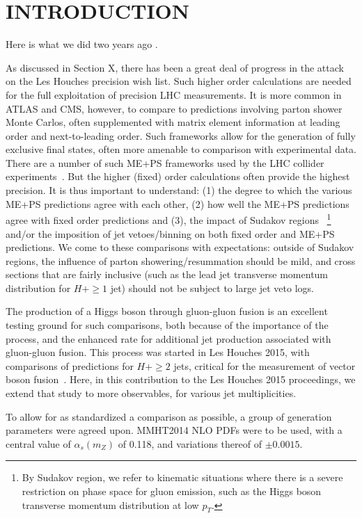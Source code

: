 \section{INTRODUCTION}
\label{sec:hjetscomp:intro}

Here is what we did two years ago \cite{AlcarazMaestre:2012vp}.

As discussed in Section X, there has been a great deal of progress in the attack on the Les Houches precision wish list. Such higher order calculations are needed for the full 
exploitation of precision LHC measurements. It is more common in ATLAS and CMS, however, 
to compare to predictions involving parton shower Monte Carlos, often supplemented with matrix element information at leading order and next-to-leading order. Such frameworks 
allow for the generation of fully exclusive final states, often more amenable to 
comparison with experimental data. There are a number of such ME+PS frameworks used by the LHC collider experiments~\cite{MEPS}. But the higher (fixed) order calculations often 
provide the highest precision. It is thus important to understand: (1) the degree to 
which the various ME+PS predictions agree with each other, (2) how well the ME+PS 
predictions agree with fixed order predictions and (3), the impact of Sudakov regions
~\footnote{By Sudakov region, we refer to kinematic situations where there is a
severe restriction on phase space for gluon emission, such as the Higgs boson transverse
momentum distribution at low $p_T$.} 
and/or the imposition of jet vetoes/binning on both fixed order and ME+PS predictions. 
We come to these comparisons with expectations: outside of Sudakov regions, the influence
of parton showering/resummation should be mild, and cross sections that are fairly 
inclusive (such as the lead jet transverse momentum distribution for $H+\ge1$ jet) 
should not be subject to large jet veto logs. 

The production of a Higgs boson through gluon-gluon fusion is an excellent testing ground
for such comparisons, both because of the importance of the process, and the enhanced 
rate for additional jet production associated with gluon-gluon fusion. This process  was started in Les Houches 2015, with comparisons of predictions for $H+\ge2$ jets, critical
for the measurement of vector boson fusion~\cite{2013}. Here, in this contribution to 
the Les Houches 2015 proceedings, we extend that study to more observables, for various 
jet multiplicities. 

To allow for as standardized a comparison as possible, a group of generation parameters 
were agreed upon. MMHT2014 NLO PDFs were to be used, with a central value of 
$\alpha_s(m_Z)$ of 0.118, and variations thereof of $\pm 0.0015$. 


